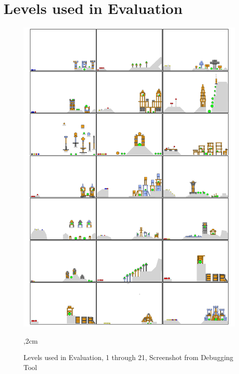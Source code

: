\appendix
\section{Levels used in Evaluation}
\begin{figure}[H]%
    \begin{center}%
        \includegraphics[width=14cm]{data/levels}%
        \vskip -0.3cm%
        \caption{Levels used in Evaluation, 1 through 21, Screenshot from Debugging Tool}%
        ,2cm%
        \label{fig:levels}%
    \end{center}%
\end{figure}%
\clearpage
